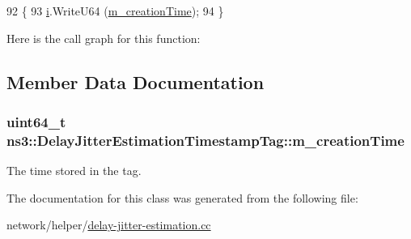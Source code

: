 \begin{DoxyCode}
92 \{
93   \hyperlink{bernuolliDistribution_8m_a6f6ccfcf58b31cb6412107d9d5281426}{i}.WriteU64 (\hyperlink{classns3_1_1DelayJitterEstimationTimestampTag_ad1a32c69c3083d54a7d81595b826da0c}{m\_creationTime});
94 \}
\end{DoxyCode}


Here is the call graph for this function\+:




\subsection{Member Data Documentation}
\subsubsection[{\texorpdfstring{m\+\_\+creation\+Time}{m_creationTime}}]{\setlength{\rightskip}{0pt plus 5cm}uint64\+\_\+t ns3\+::\+Delay\+Jitter\+Estimation\+Timestamp\+Tag\+::m\+\_\+creation\+Time\hspace{0.3cm}{\ttfamily [private]}}\hypertarget{classns3_1_1DelayJitterEstimationTimestampTag_ad1a32c69c3083d54a7d81595b826da0c}{}\label{classns3_1_1DelayJitterEstimationTimestampTag_ad1a32c69c3083d54a7d81595b826da0c}


The time stored in the tag. 



The documentation for this class was generated from the following file\+:\begin{DoxyCompactItemize}
\item 
network/helper/\hyperlink{delay-jitter-estimation_8cc}{delay-\/jitter-\/estimation.\+cc}\end{DoxyCompactItemize}
